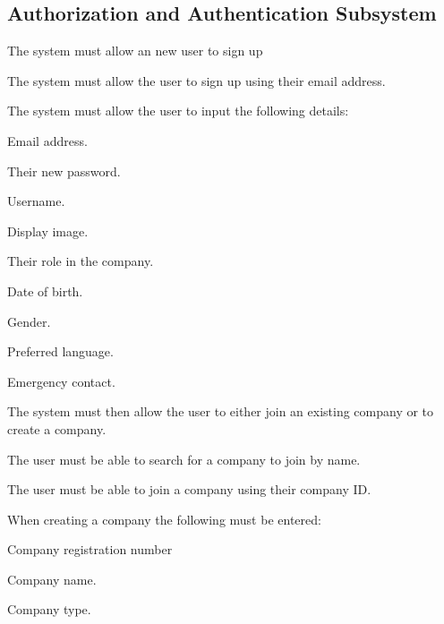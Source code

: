 \documentclass{article}
\begin{document}
	\subsection*{Authorization and Authentication Subsystem}	
	\begin{list}{R.}{}
		\item The system must allow an new user to sign up
		\begin{list}{R.}{}
			\item The system must allow the user to sign up using their email address.
			\item The system must allow the user to input the following details:
			\begin{list}{R..}{}
				\item Email address.
				\item Their new password. 
				\item Username.
				\item Display image.
				\item Their role in the company.
				\item Date of birth.
				\item Gender.
				\item Preferred language.
				\item Emergency contact. 
			\end{list} 
			\item The system must then allow the user to either join an existing company or to create a company.
			\begin{list}{R..}{}
				\item The user must be able to search for a company to join by name.
				\item The user must be able to join a company using their company ID.
			\end{list} 
			\item When creating a company the following must be entered:
			\begin{list}{R..}{}
				\item Company registration number
				\item Company name.
				\item Company type.

\end{list}
\end{list}
\end{list}
\end{document}
